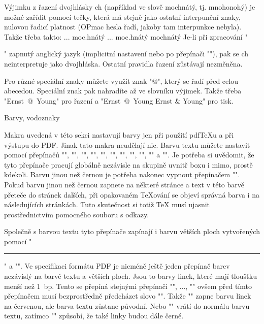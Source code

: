 Výjimku z řazení dvojhlásky ch (například ve slově mochnátý, tj. mnohonohý)
je možné zařídit pomocí tečky, která má stejně jako ostatní interpunční
znaky, nulovou řadicí platnost (OPmac hesla řadí, jakoby tam interpunkce
nebyla). Takže třeba takto:
\begtt
... \ii moc.hnátý ...
\iis moc.hnátý {mochnátý} 
\endtt
%
Je-li při zpracování "\makeindex" zapnutý anglický jazyk (implicitní
nastavení nebo po přepínači
"\ehyph"), pak se ch neinterpretuje jako dvojhláska. Ostatní pravidla řazení
zůstávají nezměněna.

Pro různé speciální znaky můžete využít znak "@", který se řadí před celou
abecedou. Speciální znak pak nahradíte až ve slovníku výjimek.
Takže třeba "\ii Ernst~@~Young" pro řazení a
"\iis Ernst~@~Young {Ernst \& Young}" pro tisk.


\sec Barvy, vodoznaky

Makra uvedená v této sekci nastavují barvy jen při použití pdf\TeX{}u a při
výstupu do PDF. Jinak tato makra neudělají nic.
%
Barvu textu můžete nastavit pomocí přepínačů 
{\localcolor\Blue "\Blue"}, 
{\localcolor\Red "\Red"}, 
{\localcolor\Brown "\Brown"},
{\localcolor\Green "\Green"}, 
{\localcolor\Yellow "\Yellow"}, 
{\localcolor\Cyan "\Cyan"}, 
{\localcolor\Magenta "\Magenta"}, 
{"\White"}, 
{\localcolor\Grey "\Grey"}, 
{\localcolor\LightGrey "\LightGrey"} a 
{"\Black"}. Je potřeba si uvědomit, že tyto
přepínače pracují globálně nezávisle na skupině uvnitř boxu i mimo, prostě
kdekoli. Barvu jinou než černou je potřeba nakonec vypnout přepínačem
"\Black". Pokud barvu jinou než černou zapnete na některé stránce a text v
této barvě přeteče do stránek dalších, při opakovaném \TeX{}ování se objeví
správná barva i na následujících stránkách. Tuto skutečnost si totiž 
\TeX{} musí ujasnit prostřednictvím pomocného souboru s odkazy.

Společně s barvou textu tyto přepínače zapínají i barvu větších ploch
vytvořených pomocí "\hrule" a "\vrule". Ve specifikaci formátu PDF je
nicméně ještě jeden přepínač barev nezávislý na barvě textu a větších ploch.
Jsou to barvy linek, které mají tloušťku menší než 1~bp. Tento  se přepíná stejnými přepínači "\Blue", ..., "\Black" ovšem 
před tímto přepínačem musí bezprostředně předcházet slovo "\linecolor".
Takže "\linecolor\Red" zapne barvu linek na červenou, ale barva textu
zůstane původní. Nebo "\Black" vrátí do normálu barvu textu, zatímco
"\linecolor\Black" způsobí, že také linky budou dále černé.

\def\podbarvi#1#2#3{\setbox0=\hbox{#3}\leavevmode
  {\localcolor\rlap{#1\strut\vrule width\wd0}#2\box0}}

